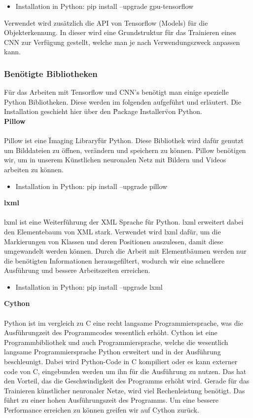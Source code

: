 \documentclass[a4paper,12pt,oneside]{article}
\begin{document}
  \begin{itemize}
\item Installation in Python: pip install --upgrade gpu-tensorflow
  \end{itemize}
  
Verwendet wird zusätzlich die API von Tensorflow (Models) für die Objekterkennung. In dieser wird eine Grundstruktur für das Trainieren eines CNN zur Verfügung gestellt, welche man je nach Verwendungszweck anpassen kann.
  
  \subsubsection{Benötigte Bibliotheken}
Für das Arbeiten mit Tensorflow und CNN's benötigt man einige spezielle Python Bibliotheken. Diese werden im folgenden aufgeführt und erläutert. Die Installation geschieht hier über den \"Package Installer\" von Python.
\\
 
\textbf{Pillow}\\\\
Pillow ist eine \"Imaging Library\" für Python. Diese Bibliothek wird dafür genutzt um Bilddateien zu öffnen, verändern und speichern zu können. Pillow benötigen wir, um in unserem Künstlichen neuronalen Netz mit Bildern und Videos arbeiten zu können.

  \begin{itemize}
\item Installation in Python: pip install --upgrade pillow
  \end{itemize}

\textbf{lxml}\\\\ 
lxml ist eine Weiterführung der XML Sprache für Python. lxml erweitert dabei den Elementebaum von XML stark. Verwendet wird lxml dafür, um die Markierungen von Klassen und deren Positionen auszulesen, damit diese umgewandelt werden können. Durch die Arbeit mit Elementbäumen werden nur die benötigten Informationen herausgefiltert, wodurch wir eine schnellere Ausführung und bessere Arbeitszeiten erreichen.
  
  \begin{itemize}
\item Installation in Python: pip install --upgrade lxml
  \end{itemize}
  
  
\textbf{Cython}\\\\
Python ist im vergleich zu C eine recht langsame Programmiersprache, was die Ausführungzeit des Programmcodes wesentlich erhöht. Cython ist eine Programmbibliothek und auch Programmiersprache, welche die wesentlich langsame Programmiersprache Python erweitert und in der Ausführung beschleunigt. Dabei wird Python-Code in C kompiliert oder es kann externer code von C, eingebunden werden um ihn für die Ausführung zu nutzen. Das hat den Vorteil, das die Geschwindigkeit des Programms erhöht wird. Gerade für das Trainieren künstlicher neuronaler Netze, wird viel Rechenleistung benötigt. Das führt zu einer hohen Ausführungszeit des Programms. Um eine bessere Performance erreichen zu können greifen wir auf Cython zurück.
\end{document}
